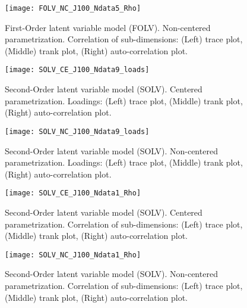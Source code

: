 %
\begin{figure}[H]
	\centering
	\texttt{[image: FOLV\_NC\_J100\_Ndata5\_Rho]}
	\caption[First-Order latent variable model (FOLV). Non-centered parametrization. Correlation of sub-dimensions. Trace, trank and auto-correlation plots.]%
	{First-Order latent variable model (FOLV). Non-centered parametrization. Correlation of sub-dimensions: (Left) trace plot, (Middle) trank plot, (Right) auto-correlation plot.}
	\label{fig:FOLV_NC_chains8}
\end{figure}
%
\begin{figure}[H]
	\centering
	\texttt{[image: SOLV\_CE\_J100\_Ndata9\_loads]}
	\caption[Second-Order latent variable model (SOLV). Centered parametrization. Loadings. Trace, trank and auto-correlation plots.]%
	{Second-Order latent variable model (SOLV). Centered parametrization. Loadings: (Left) trace plot, (Middle) trank plot, (Right) auto-correlation plot.}
	\label{fig:SOLV_CE_chains1}
\end{figure}
%
\begin{figure}[H]
	\centering
	\texttt{[image: SOLV\_NC\_J100\_Ndata9\_loads]}
	\caption[Second-Order latent variable model (SOLV). Non-centered parametrization. Loadings. Trace, trank and auto-correlation plots.]%
	{Second-Order latent variable model (SOLV). Non-centered parametrization. Loadings: (Left) trace plot, (Middle) trank plot, (Right) auto-correlation plot.}
	\label{fig:SOLV_NC_chains1}
\end{figure}
%
\begin{figure}[H]
	\centering
	\texttt{[image: SOLV\_CE\_J100\_Ndata1\_Rho]}
	\caption[Second-Order latent variable model (SOLV). Centered parametrization. Correlation of sub-dimensions. Trace, trank and auto-correlation plots.]%
	{Second-Order latent variable model (SOLV). Centered parametrization. Correlation of sub-dimensions: (Left) trace plot, (Middle) trank plot, (Right) auto-correlation plot.}
	\label{fig:SOLV_CE_chains2}
\end{figure}
%
\begin{figure}[H]
	\centering
	\texttt{[image: SOLV\_NC\_J100\_Ndata1\_Rho]}
	\caption[Second-Order latent variable model (SOLV). Non-centered parametrization. Correlation of sub-dimensions. Trace, trank and auto-correlation plots.]%
	{Second-Order latent variable model (SOLV). Non-centered parametrization. Correlation of sub-dimensions: (Left) trace plot, (Middle) trank plot, (Right) auto-correlation plot.}
	\label{fig:SOLV_NC_chains2}
\end{figure}
